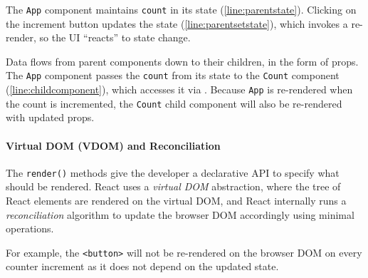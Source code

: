 The \texttt{App} component maintains \texttt{count} in its
state (\cref{line:parentstate}). Clicking on the increment button
updates the state (\cref{line:parentsetstate}), which invokes
a re-render, so the UI ``reacts'' to state change.

Data flows from parent components down to their children,
in the form of props. 
The \texttt{App} component passes the \texttt{count}
from its state to the \texttt{Count} component 
(\cref{line:childcomponent}), which accesses it via
. 
Because \texttt{App} is re-rendered when the count is incremented,
the \texttt{Count} child component will also be re-rendered
with updated props.

\paragraph{Virtual DOM (VDOM) and Reconciliation}
The \texttt{render()} methods give the developer a declarative API
to specify what should be rendered. React uses a 
\textit{virtual DOM} abstraction, where the tree of React elements
are rendered on the virtual DOM, and React internally
runs a \textit{reconciliation} algorithm to update the browser DOM
accordingly using minimal operations.

For example, the \texttt{<button>} will not be re-rendered
on the browser DOM on every counter increment as it does not
depend on the updated state.
